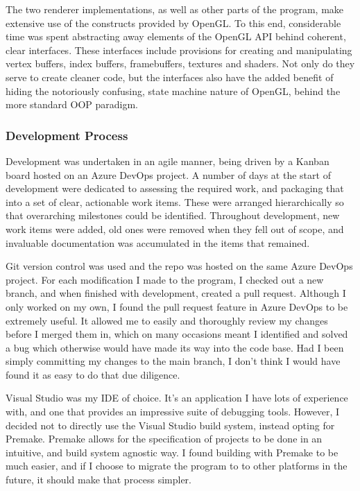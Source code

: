The two renderer implementations, as well as other parts of the program, make extensive use of the constructs provided by OpenGL. To this end, considerable time was spent abstracting away elements of the OpenGL API behind coherent, clear interfaces. These interfaces include provisions for creating and manipulating vertex buffers, index buffers, framebuffers, textures and shaders. Not only do they serve to create cleaner code, but the interfaces also have the added benefit of hiding the notoriously confusing, state machine nature of OpenGL, behind the more standard OOP paradigm.

\subsubsection{Development Process}

Development was undertaken in an agile manner, being driven by a Kanban board hosted on an Azure DevOps project. A number of days at the start of development were dedicated to assessing the required work, and packaging that into a set of clear, actionable work items. These were arranged hierarchically so that overarching milestones could be identified. Throughout development, new work items were added, old ones were removed when they fell out of scope, and invaluable documentation was accumulated in the items that remained.

Git version control was used and the repo was hosted on the same Azure DevOps project. For each modification I made to the program, I checked out a new branch, and when finished with development, created a pull request. Although I only worked on my own, I found the pull request feature in Azure DevOps to be extremely useful. It allowed me to easily and thoroughly review my changes before I merged them in, which on many occasions meant I identified and solved a bug which otherwise would have made its way into the code base. Had I been simply committing my changes to the main branch, I don't think I would have found it as easy to do that due diligence.

Visual Studio was my IDE of choice. It's an application I have lots of experience with, and one that provides an impressive suite of debugging tools. However, I decided not to directly use the Visual Studio build system, instead opting for Premake. Premake allows for the specification of projects to be done in an intuitive, and build system agnostic way. I found building with Premake to be much easier, and if I choose to migrate the program to to other platforms in the future, it should make that process simpler.

